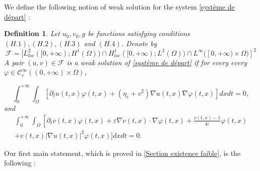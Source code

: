 \documentclass[reqno,12pt,twoside]{amsart}
\newtheorem{definition}{Definition}[section]
\numberwithin{equation}{section} \numberwithin{theorem}{section}
\numberwithin{proposition}{section} \numberwithin{lemma}{section}
\numberwithin{corollary}{section}
\numberwithin{definition}{section} \numberwithin{remark}{section}
\begin{document}
We define the following notion of weak solution for the system \eqref{système de départ} : 

\begin{definition}\label{solution faible}
Let $u_0,v_0,g$ be functions satisfying conditions $(H.1), (H.2), (H.3)$ and $(H.4)$. Denote by 
\begin{equation}\label{notation : F}
\mathcal{F} = [L_{loc}^2([0,+\infty);H^1(\Omega))\cap H_{loc}^1([0,+\infty) ; L^2(\Omega))\cap L^\infty([0,+\infty)\times \Omega)]^2
\end{equation}
A pair $(u,v)\in \mathcal{F}$ is a weak solution of \eqref{système de départ} if for every every $\varphi\in \mathcal{C}_c^\infty ((0,+\infty)\times \Omega)$, 

\begin{equation}\label{eq : eq in u}
\int_0^{+\infty} \int_\Omega \left[\partial_t u(t,x) \varphi(t,x) + (\eta_\varepsilon + v^2) \nabla u (t,x) \nabla \varphi(t,x)\right] dxdt = 0,
\end{equation}
and 
\begin{multline}\label{eq : eq in v}
\int_0^{+\infty} \int_\Omega \left[\partial_t v(t,x) \varphi(t,x) +  \varepsilon \nabla v(t,x)\cdot  \nabla \varphi(t,x) +\frac{v(t,x) - 1}{4\varepsilon} \varphi(t,x)\right.\\
+ v(t,x) |\nabla u(t,x)|^2 \varphi(t,x)\bigg] dxdt =0. 
\end{multline}
\end{definition}

Our first main statement, which is proved in \autoref{Section existence faible}, is the following : 
\end{document}
